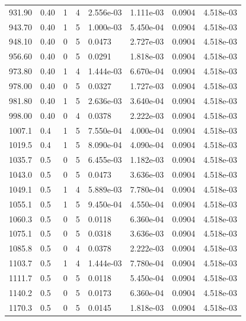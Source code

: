 \documentclass[preview]{standalone}
\begin{document}
{{{{{\begin{tabular}{L{1.2cm}C{1.2cm} C{0.3cm}C{0.5cm} C{1.4cm}C{1.4cm} C{1.4cm}C{1.4cm}}
  931.90  &  0.40  & 1     &  4 &  2.556e-03  & 1.111e-03  & 0.0904 &  4.518e-03   \\ 
  943.70  &  0.40  & 1     &  5 &  1.000e-03  & 5.450e-04  & 0.0904 &  4.518e-03   \\ 
  948.10  &  0.40  & 0     &  5 &  0.0473  & 2.727e-03  & 0.0904 &  4.518e-03   \\ 
  956.60  &  0.40  & 0     &  5 &  0.0291  & 1.818e-03  & 0.0904 &  4.518e-03   \\ 
  973.80  &  0.40  & 1     &  4 &  1.444e-03  & 6.670e-04  & 0.0904 &  4.518e-03   \\ 
  978.00  &  0.40  & 0     &  5 &  0.0327  & 1.727e-03  & 0.0904 &  4.518e-03   \\ 
  981.80  &  0.40  & 1     &  5 &  2.636e-03  & 3.640e-04  & 0.0904 &  4.518e-03   \\ 
  998.00  &  0.40  & 0     &  4 &  0.0378  & 2.222e-03  & 0.0904 &  4.518e-03   \\ 
  1007.1  &   0.4  & 1     &  5 &  7.550e-04  & 4.000e-04  & 0.0904 &  4.518e-03   \\ 
  1019.5  &   0.4  & 1     &  5 &  8.090e-04  & 4.090e-04  & 0.0904 &  4.518e-03   \\ 
  1035.7  &   0.5  & 0     &  5 &  6.455e-03  & 1.182e-03  & 0.0904 &  4.518e-03   \\ 
  1043.0  &   0.5  & 0     &  5 &  0.0473  & 3.636e-03  & 0.0904 &  4.518e-03   \\ 
  1049.1  &   0.5  & 1     &  4 &  5.889e-03  & 7.780e-04  & 0.0904 &  4.518e-03   \\ 
  1055.1  &   0.5  & 1     &  5 &  9.450e-04  & 4.550e-04  & 0.0904 &  4.518e-03   \\ 
  1060.3  &   0.5  & 0     &  5 &  0.0118  & 6.360e-04  & 0.0904 &  4.518e-03   \\ 
  1075.1  &   0.5  & 0     &  5 &  0.0318  & 3.636e-03  & 0.0904 &  4.518e-03   \\ 
  1085.8  &   0.5  & 0     &  4 &  0.0378  & 2.222e-03  & 0.0904 &  4.518e-03   \\ 
  1103.7  &   0.5  & 1     &  4 &  1.444e-03  & 7.780e-04  & 0.0904 &  4.518e-03   \\ 
  1111.7  &   0.5  & 0     &  5 &  0.0118  & 5.450e-04  & 0.0904 &  4.518e-03   \\ 
  1140.2  &   0.5  & 0     &  5 &  0.0173  & 6.360e-04  & 0.0904 &  4.518e-03   \\ 
  1170.3  &   0.5  & 0     &  5 &  0.0145  & 1.818e-03  & 0.0904 &  4.518e-03   \\ 

\end{tabular}}}}}}
\end{document}
